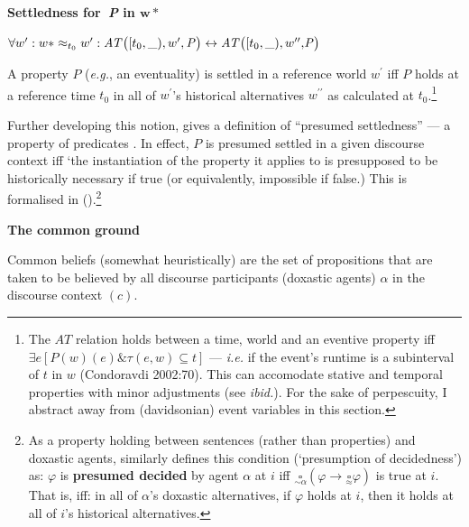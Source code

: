 \documentclass[12pt,dvipsnames]{report}
\begin{document}
\pex \textbf{Settledness for\textbf{\textit{\ P}} in $ \boldsymbol{w*}$}


$\forall w^{\prime}:w*\approx_{t_0}w^{\prime}:\\\mathit{AT}\big([t_0,\_),w^\prime, \mathit P\big)\leftrightarrow \mathit{AT}\big([t_0,\_),w^{\prime\prime},\mathit{\!P}\big)$%


A property $P$ (\textit{e.g.}, an eventuality) is settled in a reference world $w^\prime$ iff $\mathit P$ holds at a reference time $t_0$ in all of $w^\prime$'s historical alternatives $w^{\prime\prime}$ as calculated at $t_0$.\footnote{The $AT$ relation holds between a time, world and an eventive property iff $\exists e[\mathit P(w)(e)\&\tau(e,w)\subseteq t]$ --- \textit{i.e.} if the event's runtime is a subinterval of $t$ in $w$ (Condoravdi 2002:70). This can accomodate stative and temporal properties with minor adjustments (see \textit{ibid.}). For the sake of perpescuity, I abstract away from (davidsonian) event variables in this section.}
\xe

\noindent Further developing this notion, \citet[82]{Condoravdi2002} gives a definition of ``presumed settledness'' --- a property of predicates \citep[see also][]{Kaufmann2002,Kaufmann2005}. In effect, $ P $ is presumed settled in a given discourse context iff `the instantiation of the property it applies to is presupposed to be historically necessary if true (or equivalently, impossible if false.) This is formalised in ().\footnote{As a property holding between sentences (rather than properties) and doxastic agents, \citeauthor{Kaufmann2005} similarly defines this condition (`presumption of decidedness') as:
	\exdisplay$\varphi $ is \textbf{presumed decided} by agent $ \alpha $ at $ i $ iff $\underset{\sim\alpha}{\square}(\varphi\to\underset{\approx}{\square}\varphi) $ is true at $ i $.\\
	That is, iff: in all of $ \alpha$'s doxastic alternatives, if $ \varphi $ holds at $ i $, then it holds at all of $ i $'s historical alternatives.\xe\label{K05-presump}
}


\pex[nopreamble]\a \textbf{The common ground}

Common beliefs (somewhat heuristically) are the set of propositions that are taken to be believed by all discourse participants (doxastic agents) $ \alpha $ in the discourse context $ (c) $.
\end{document}
